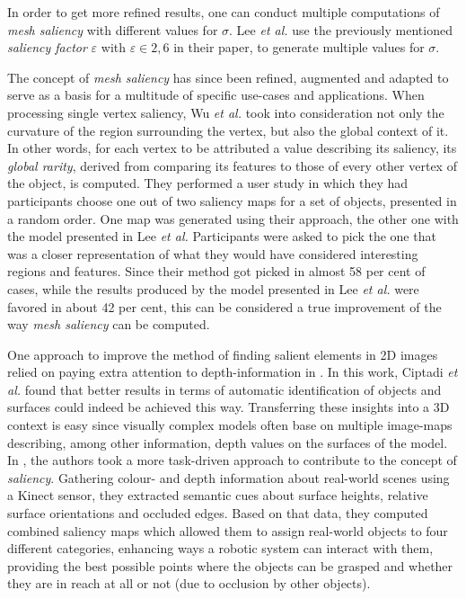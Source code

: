 In order to get more refined results, one can conduct multiple computations of \textit{mesh saliency} with different values for $\sigma$. Lee \textit{et al.} use the previously mentioned \textit{saliency factor} $\varepsilon$ with $\varepsilon \in 2,6$ in their paper, to generate multiple values for $\sigma$.

The concept of \textit{mesh saliency} has since been refined, augmented and adapted to serve as a basis for a multitude of specific use-cases and applications. When processing single vertex saliency, Wu \textit{et al.} \cite{wu2013mesh} took into consideration not only the curvature of the region surrounding the vertex, but also the global context of it. In other words, for each vertex to be attributed a value describing its saliency, its \textit{global rarity}, derived from comparing its features to those of every other vertex of the object, is computed. They performed a user study in which they had participants choose one out of two saliency maps for a set of objects, presented in a random order. One map was generated using their approach, the other one with the model presented in Lee \textit{et al.} Participants were asked to pick the one that was a closer representation of what they would have considered interesting regions and features. Since their method got picked in almost 58 per cent of cases, while the results produced by the model presented in Lee \textit{et al.} were favored in about 42 per cent, this can be considered a true improvement of the way \textit{mesh saliency} can be computed.

One approach to improve the method of finding salient elements in 2D images relied on paying extra attention to depth-information in \cite{ciptadi2013depth}. In this work, Ciptadi \textit{et al.} found that better results in terms of automatic identification of objects and surfaces could indeed be achieved this way. Transferring these insights into a 3D context is easy since visually complex models often base on multiple image-maps describing, among other information, depth values on the surfaces of the model.
In \cite{potapova2011learning}, the authors took a more task-driven approach to contribute to the concept of \textit{saliency}. Gathering colour- and depth information about real-world scenes using a Kinect sensor, they extracted semantic cues about surface heights, relative surface orientations and occluded edges. Based on that data, they computed combined saliency maps which allowed them to assign real-world objects to four different categories, enhancing ways a robotic system can interact with them, providing the best possible points where the objects can be grasped and whether they are in reach at all or not (due to occlusion by other objects).

